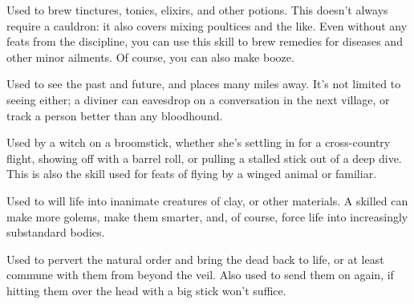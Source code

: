 Used to brew tinctures, tonics, elixirs, and other potions.
This doesn't always require a cauldron: it also covers mixing poultices and the like.
Even without any feats from the discipline, you can use this skill to brew remedies for diseases and other minor ailments.
Of course, you can also make booze.


Used to see the past and future, and places many miles away.
It's not limited to seeing either; a diviner can eavesdrop on a conversation in the next village, or track a person better than any bloodhound.


Used by a witch on a broomstick, whether she's settling in for a cross-country flight, showing off with a barrel roll, or pulling a stalled stick out of a deep dive.
This is also the skill used for feats of flying by a winged animal or familiar.


Used to will life into inanimate creatures of clay, or other materials.
A skilled  can make more golems, make them smarter, and, of course, force life into increasingly substandard bodies.


Used to pervert the natural order and bring the dead back to life, or at least commune with them from beyond the veil.
Also used to send them on again, if hitting them over the head with a big stick won't suffice.



